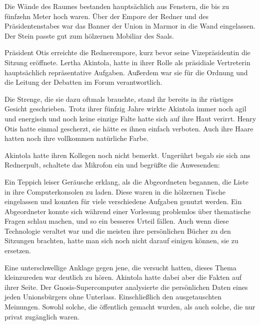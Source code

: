 \par

Die Wände des Raumes bestanden hauptsächlich aus Fenstern, die bis zu fünfzehn Meter hoch waren.
Über der Empore der Redner und des Präsidentenstabes war das Banner der Union in Marmor in die Wand eingelassen.
Der Stein passte gut zum hölzernen Mobiliar des Saals.

\par

Präsident Otis erreichte die Rednerempore, kurz bevor seine Vizepräsidentin die Sitzung eröffnete.
Lertha Akintola, hatte in ihrer Rolle als präsidiale Vertreterin hauptsächlich repräsentative Aufgaben.
Außerdem war sie für die Ordnung und die Leitung der Debatten im Forum verantwortlich.

\par

Die Strenge, die sie dazu oftmals brauchte, stand ihr bereits in ihr rüstiges Gesicht geschrieben.
Trotz ihrer fünfzig Jahre wirkte Akintola immer noch agil und energisch und noch keine einzige Falte hatte sich auf ihre Haut verirrt.
Henry Otis hatte einmal gescherzt, sie hätte es ihnen einfach verboten.
Auch ihre Haare hatten noch ihre vollkommen natürliche Farbe.

\par

Akintola hatte ihren Kollegen noch nicht bemerkt.
Ungerührt begab sie sich ans Rednerpult, schaltete das Mikrofon ein und begrüßte die Anwesenden:

\par

Ein Teppich leiser Geräusche erklang, als die Abgeordneten begannen, die Liste in ihre Computerkonsolen zu laden.
Diese waren in die hölzernen Tische eingelassen und konnten für viele verschiedene Aufgaben genutzt werden.
Ein Abgeordneter konnte sich während einer Vorlesung problemlos über thematische Fragen schlau machen, und so ein besseres Urteil fällen.
Auch wenn diese Technologie veraltet war und die meisten ihre persönlichen Bücher zu den Sitzungen brachten, hatte man sich noch nicht darauf einigen können, sie zu ersetzen.

\par

Eine unterschwellige Anklage gegen jene, die versucht hatten, dieses Thema kleinzureden war deutlich zu hören.
Akintola hatte dabei aber die Fakten auf ihrer Seite.
Der Gnosis-Supercomputer analysierte die persönlichen Daten eines jeden Unionsbürgers ohne Unterlass.
Einschließlich den ausgetauschten Meinungen.
Sowohl solche, die öffentlich gemacht wurden, als auch solche, die nur privat zugänglich waren.

